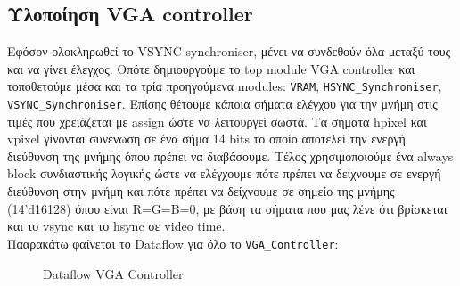 \documentclass[12pt,a4paper]{article}
\begin{document}
	
	\subsection{Υλοποίηση VGA controller}
	Εφόσον ολοκληρωθεί το VSYNC synchroniser, μένει να συνδεθούν όλα μεταξύ τους και να γίνει έλεγχος. Οπότε δημιουργούμε το top module VGA controller και τοποθετούμε μέσα και τα τρία προηγούμενα modules: \verb*|VRAM|, \verb*|HSYNC_Synchroniser|, \verb*|VSYNC_Synchroniser|. Επίσης θέτουμε κάποια σήματα ελέγχου για την μνήμη στις τιμές που χρειάζεται με assign ώστε να λειτουργεί σωστά. Τα σήματα hpixel και vpixel γίνονται συνένωση σε ένα σήμα 14 bits το οποίο αποτελεί την ενεργή διεύθυνση της μνήμης όπου πρέπει να διαβάσουμε. Τέλος χρησιμοποιούμε ένα always block συνδιαστικής λογικής ώστε να ελέγχουμε πότε πρέπει να δείχνουμε σε ενεργή διεύθυνση στην μνήμη και πότε πρέπει να δείχνουμε σε σημείο της μνήμης (14'd16128) όπου είναι R=G=B=0, με βάση τα σήματα που μας λένε ότι βρίσκεται και το vsync και το hsync σε video time.\\
	Πααρακάτω φαίνεται το Dataflow για όλο το \verb*|VGA_Controller|:
	\begin{figure} [H]
		\caption{Dataflow VGA Controller}
		\label{Dataflow VGA Controller}
	\end{figure}
	
\end{document}
